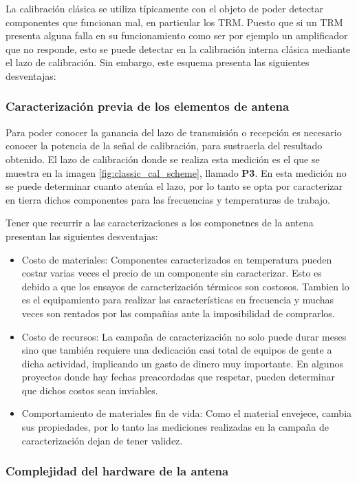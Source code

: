 La calibración clásica se utiliza típicamente con el objeto de poder detectar componentes que funcionan mal, en particular los
TRM. Puesto que si un TRM presenta alguna falla en su funcionamiento como ser por ejemplo un amplificador que no responde, esto
se puede detectar en la calibración interna clásica mediante el lazo de calibración. Sin embargo, este esquema presenta las
siguientes desventajas: 


\subsubsection{Caracterización previa de los elementos de antena}

Para poder conocer la ganancia del lazo de transmisión o recepción es necesario conocer la potencia de la señal de
calibración, para sustraerla del resultado obtenido. El lazo de calibración donde se realiza esta medición es el que se
muestra en la imagen \ref{fig:classic_cal_scheme}, llamado \textbf{P3}. En esta medición no se puede determinar cuanto atenúa
el lazo, por lo tanto se opta por caracterizar en tierra dichos componentes para las frecuencias y temperaturas de trabajo.

Tener que recurrir a las caracterizaciones a los componetnes de la antena presentan las siguientes desventajas: 

\begin{itemize}
	\item Costo de materiales: Componentes caracterizados en temperatura pueden costar varias veces el precio de un componente sin
		caracterizar. Esto es debido a que los ensayos de caracterización térmicos son costosos. Tambien lo es el equipamiento para
		realizar las características en frecuencia y muchas veces son rentados por las compañias ante la imposibilidad de comprarlos.
	\item Costo de recursos: La campaña de caracterización no solo puede durar meses sino que también requiere una dedicación
		casi total de equipos de gente a dicha actividad, implicando un gasto de dinero muy importante. En algunos proyectos donde hay
		fechas preacordadas que respetar, pueden determinar que dichos costos sean inviables.
	\item Comportamiento de materiales fin de vida: Como el material envejece, cambia sus propiedades, por lo tanto las mediciones
		realizadas en la campaña de caracterización dejan de tener validez.
\end{itemize}


\subsubsection{Complejidad del hardware de la antena}


